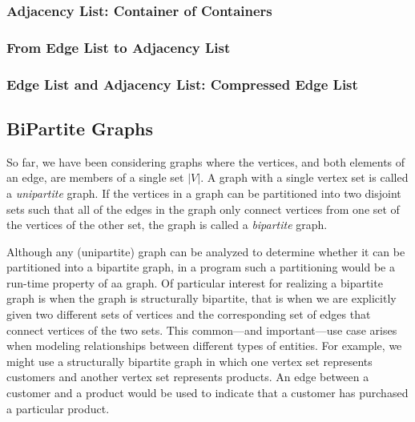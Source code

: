 \subsubsection{Adjacency List: Container of Containers}



\subsubsection{From Edge List to Adjacency List}


\subsubsection{Edge List and Adjacency List: Compressed Edge List}



\subsection{BiPartite Graphs}

So far, we have been considering graphs where the vertices, and both elements of an
edge, are members of a single set $|V|$.  A graph with a single vertex set is called a
\emph{unipartite} graph.  If the vertices in a graph can be partitioned into two
disjoint sets such that all of the edges in the graph only connect vertices from one
set of the vertices of the other set, the graph is called a \emph{bipartite} graph.

Although any (unipartite) graph can be analyzed to determine whether it can be partitioned into a bipartite graph, 
in a program such a partitioning would be a run-time property of aa graph.  Of particular interest for realizing a bipartite graph is when the graph is structurally bipartite, that is when we are explicitly given two different sets of vertices and the corresponding set of edges that connect vertices of the two sets.  This common---and important---use case arises when modeling relationships between different types of entities.  For example, we might use a structurally bipartite graph in which one vertex set represents customers and another vertex set represents products.  An edge between a customer and a product would be used to indicate that a customer has purchased a particular product.

